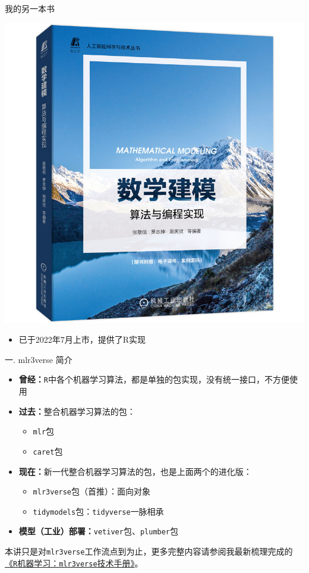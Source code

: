 \documentclass[
  11pt,
  ignorenonframetext,
  dvipsnames,UTF8]{beamer}
\providecommand{\tightlist}{%
  \setlength{\itemsep}{0pt}\setlength{\parskip}{0pt}}
\begin{document}
\begin{frame}{我的另一本书}
\protect\hypertarget{ux6211ux7684ux53e6ux4e00ux672cux4e66}{}
\begin{center}\includegraphics[width=0.55\linewidth]{images/myMathModel} \end{center}

\begin{itemize}
\tightlist
\item
  已于2022年7月上市，提供了R实现
\end{itemize}
\end{frame}

\begin{frame}[fragile]{一. mlr3verse 简介}
\protect\hypertarget{ux4e00.-mlr3verse-ux7b80ux4ecb}{}
\begin{itemize}
\item
  \textbf{曾经：}\texttt{R}中各个机器学习算法，都是单独的包实现，没有统一接口，不方便使用
\item
  \textbf{过去：}整合机器学习算法的包：

  \begin{itemize}
  \tightlist
  \item
    \texttt{mlr}包
  \item
    \texttt{caret}包
  \end{itemize}
\item
  \textbf{现在：}新一代整合机器学习算法的包，也是上面两个的进化版：

  \begin{itemize}
  \tightlist
  \item
    \texttt{mlr3verse}包（首推）：面向对象
  \item
    \texttt{tidymodels}包：\texttt{tidyverse}一脉相承
  \end{itemize}
\item
  \textbf{模型（工业）部署：}\texttt{vetiver}包、\texttt{plumber}包
\end{itemize}

本讲只是对\texttt{mlr3verse}工作流点到为止，更多完整内容请参阅我最新梳理完成的\href{https://gitee.com/zhjx19/rconf15}{《\texttt{R}机器学习：\texttt{mlr3verse}技术手册》}。
\end{frame}
\end{document}
